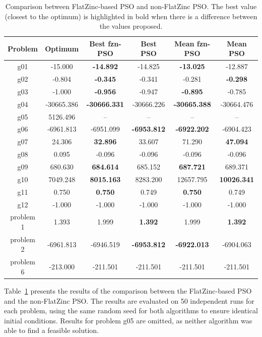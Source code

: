 \begin{table}[t]
	\centering
	\footnotesize
	\caption{Comparison between FlatZinc-based PSO and non-FlatZinc PSO. The best value (closest to the optimum) is highlighted in bold when there is a difference between the values proposed.}
	\label{tab:fzn_pso_comparison}
	\setlength{\tabcolsep}{5pt}
	\begin{tabular}{cccccc}
		\toprule
		\textbf{Problem} & \textbf{Optimum} & \textbf{Best fzn-PSO} & \textbf{Best PSO} & \textbf{Mean fzn-PSO} & \textbf{Mean PSO} \\
		\midrule
		g01 & -15.000 & \textbf{-14.892} & -14.825 & \textbf{-13.025} & -12.887 \\
		\midrule
		g02 & -0.804 & \textbf{-0.345} & -0.341 & -0.281 & \textbf{-0.298} \\
		\midrule
		g03 & -1.000 & \textbf{-0.956} & -0.947 & \textbf{-0.895} & -0.785 \\
		\midrule
		g04 & -30665.386 & \textbf{-30666.331} & -30666.226 & \textbf{-30665.388} & -30664.476 \\
		\midrule
		g05 & 5126.496 & -- & -- & -- & -- \\
		\midrule
		g06 & -6961.813 & -6951.099 & \textbf{-6953.812} & \textbf{-6922.202} & -6904.423 \\
		\midrule
		g07 & 24.306 & \textbf{32.896} & 33.607 & 71.290 & \textbf{47.094} \\
		\midrule
		g08 & 0.095 & -0.096 & -0.096 & -0.096 & -0.096 \\
		\midrule
		g09 & 680.630 & \textbf{684.614} & 685.152 & \textbf{687.721} & 689.371 \\
		\midrule
		g10 & 7049.248 & \textbf{8015.163} & 8283.200 & 12657.795 & \textbf{10026.341} \\
		\midrule
		g11 & 0.750 & \textbf{0.750} & 0.749 & \textbf{0.750} & 0.749 \\
		\midrule
		g12 & -1.000 & -1.000 & -1.000 & -1.000 & -1.000 \\
		\midrule
		problem 1 & 1.393 & 1.999 & \textbf{1.392} & 1.999 & \textbf{1.392} \\
		\midrule
		problem 2 & -6961.813 & -6946.519 & \textbf{-6953.812} & \textbf{-6922.013} & -6904.063 \\
		\midrule
		problem 6 & -213.000 & -211.501 & -211.501 & -211.501 & -211.501 \\
		\bottomrule
	\end{tabular}
\end{table}

Table~\ref{tab:fzn_pso_comparison} presents the results of the comparison between the FlatZinc-based PSO and the non-FlatZinc PSO. The results are evaluated on 50 independent runs for each problem, using the same random seed for both algorithms to ensure identical initial conditions. Results for problem g05 are omitted, as neither algorithm was able to find a feasible solution.

